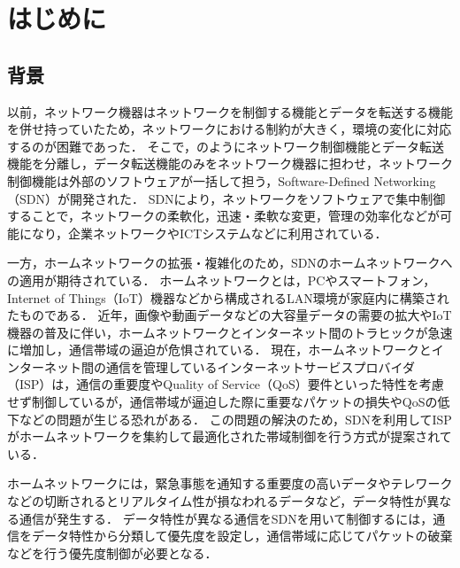 \documentclass[a4paper,11pt,uplatex]{ujreport}
\begin{document}
\tableofcontents

\clearpage


\chapter{はじめに}
\label{chap:Introduction}


\section{背景}
\label{sec:背景}


  以前，ネットワーク機器はネットワークを制御する機能とデータを転送する機能を併せ持っていたため，ネットワークにおける制約が大きく，環境の変化に対応するのが困難であった．
  そこで，のようにネットワーク制御機能とデータ転送機能を分離し，データ転送機能のみをネットワーク機器に担わせ，ネットワーク制御機能は外部のソフトウェアが一括して担う，Software-Defined Networking（SDN）が開発された．
  SDNにより，ネットワークをソフトウェアで集中制御することで，ネットワークの柔軟化，迅速・柔軟な変更，管理の効率化などが可能になり，企業ネットワークやICTシステムなどに利用されている\cite{NEC}．\par
  一方，ホームネットワークの拡張・複雑化のため，SDNのホームネットワークへの適用が期待されている．
  ホームネットワークとは，PCやスマートフォン，Internet of Things（IoT）機器などから構成されるLAN環境が家庭内に構築されたものである．
  近年，画像や動画データなどの大容量データの需要の拡大やIoT機器の普及に伴い，ホームネットワークとインターネット間のトラヒックが急速に増加し，通信帯域の逼迫が危惧されている\cite{ガイドライン}．
  現在，ホームネットワークとインターネット間の通信を管理しているインターネットサービスプロバイダ（ISP）は，通信の重要度やQuality of Service（QoS）要件といった特性を考慮せず制御しているが，通信帯域が逼迫した際に重要なパケットの損失やQoSの低下などの問題が生じる恐れがある．
  この問題の解決のため，SDNを利用してISPがホームネットワークを集約して最適化された帯域制御を行う方式が提案されている\cite{Framework}．\par
  ホームネットワークには，緊急事態を通知する重要度の高いデータやテレワークなどの切断されるとリアルタイム性が損なわれるデータなど，データ特性が異なる通信が発生する．
  データ特性が異なる通信をSDNを用いて制御するには，通信をデータ特性から分類して優先度を設定し，通信帯域に応じてパケットの破棄などを行う優先度制御が必要となる．
\end{document}
